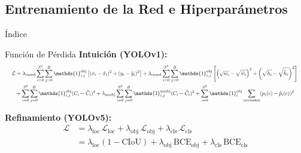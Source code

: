 \documentclass[aspectratio=169]{beamer}
\begin{document}
	\subsection{Entrenamiento de la Red e Hiperparámetros}
	\begin{frame}{Índice}
		\tableofcontents[currentsubsection] 
	\end{frame}
	\begin{frame}{Función de Pérdida}
		\textbf{Intuición (YOLOv1):}
		\vspace{-0.1cm}
	\begin{equation*}
	\resizebox{\textwidth}{!}{%
		$ \begin{aligned}
		\mathcal{L} &= \lambda_{\text{coord}} \sum_{i=0}^{S^2} \sum_{j=0}^B \mathds{1}_{i,j}^{\text{obj}} \left[ (x_i - \hat{x}_i)^2 + (y_i - \hat{y}_i)^2 \right] 
		+ \lambda_{\text{coord}} \sum_{i=0}^{S^2} \sum_{j=0}^B \mathds{1}_{i,j}^{\text{obj}} \left[ \left( \sqrt{w_i} - \sqrt{\hat{w}_i} \right)^2 + \left( \sqrt{h_i} - \sqrt{\hat{h}_i} \right)^2 \right] \\
		& + \sum_{i=0}^{S^2} \sum_{j=0}^B \mathds{1}_{i,j}^{\text{obj}} (C_i - \hat{C}_i)^2 
		+ \lambda_{\text{noobj}} \sum_{i=0}^{S^2} \sum_{j=0}^B \mathds{1}_{i,j}^{\text{noobj}} (C_i - \hat{C}_i)^2 
		+ \sum_{i=0}^{S^2} \mathds{1}_i^{\text{obj}} \sum_{c \in \text{classes}}(p_i(c) - \hat{p}_i(c))^2
		\end{aligned} $ 
	} 
	\end{equation*}
		
		\vfill
		
		\textbf{Refinamiento (YOLOv5):}
		\begin{equation*}
		\begin{aligned}
		\mathcal{L} &= \lambda_{\text{loc}}\,\mathcal{L}_{\text{loc}}
		+
		\lambda_{\text{obj}}\,\mathcal{L}_{\text{obj}}
		+
		\lambda_{\text{cls}}\,\mathcal{L}_{\text{cls}} \\
		&=\lambda_{\text{loc}}(1 - \mathrm{CIoU}) + \lambda_{\text{obj}}\,\mathrm{BCE}_{\text{obj}} + \lambda_{\text{cls}}\,\mathrm{BCE}_{\text{cls}}
		\end{aligned}
		\end{equation*}
	\end{frame}
	
\end{document}
